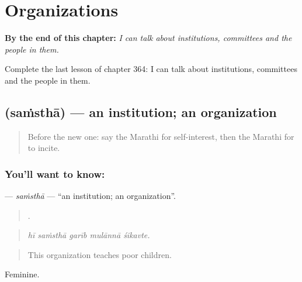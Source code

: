 
\chapter{Organizations}
\label{ch:mr-organizations}

\begin{chapteropening}
\textbf{By the end of this chapter:} \emph{I can talk about institutions, committees and the people in them.}

Complete the last lesson of chapter 364: I can talk about institutions, committees and the people in them.
\end{chapteropening}

\section[\texorpdfstring{\mr{संस्था} (saṁsthā)}{संस्था (saṁsthā)}]{ (saṁsthā) — an institution; an organization}

\label{lesson:MR-C364-samstha}



\begin{quote}
Before the new one: say the Marathi for self-interest, then the Marathi for to incite.
\end{quote}

\subsection*{You'll want to know: }
\textbf{} — \emph{saṁsthā} — \textquotedblleft{}an institution; an organization\textquotedblright{}.

\begin{quote}
    .
\end{quote}

\begin{quote}
\emph{hī saṁsthā garīb mulānnā śikavte.}
\end{quote}

\begin{quote}
This organization teaches poor children.
\end{quote}

Feminine.

